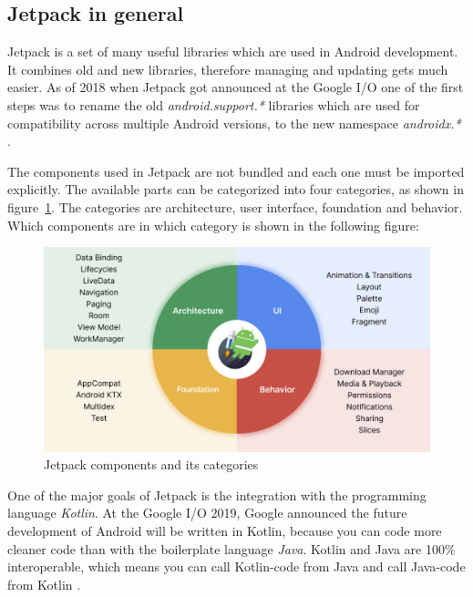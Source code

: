 \subsection{Jetpack in general}
\label{cha:jetpack_general}

Jetpack is a set of many useful libraries which are used in Android development. It combines old and new libraries, therefore managing and updating gets much easier. As of 2018 when Jetpack got announced at the Google I/O one of the first steps was to rename the old \textit{android.support.*} libraries which are used for compatibility across multiple Android versions, to the new namespace \textit{androidx.*} \cite{allen2021introducingandroid}.

The components used in Jetpack are not bundled and each one must be imported explicitly. The available parts can be categorized into four categories, as shown in figure~\ref{fig:jetpack_components}. The categories are architecture, user interface, foundation and behavior. Which components are in which category is shown in the following figure:

\begin{figure}[ht]
  \includegraphics[width=\linewidth]{images/android-jetpack-components.png}
  \caption{Jetpack components and its categories \cite{Figure_1}}
  \label{fig:jetpack_components}
\end{figure}

One of the major goals of Jetpack is the integration with the programming language \textit{Kotlin}.
At the Google I/O 2019, Google announced the future development of Android will be written in Kotlin, because you can code more cleaner code than with the boilerplate language \textit{Java}. Kotlin and Java are 100\% interoperable, which means you can call Kotlin-code from Java and call Java-code from Kotlin \cite{android_kotlin_first}.
    
